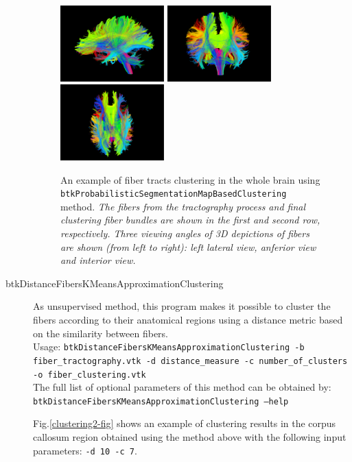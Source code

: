 \begin{description}
\begin{figure}[h]
        \includegraphics[width=4cm]{Clustering1-Left-View}
        \includegraphics[width=4cm]{Clustering1-Anterior-View}
        \includegraphics[width=4cm]{Clustering1-Interior-View}

        \caption{An example of fiber tracts clustering in the whole brain using \texttt{btkProbabilisticSegmentationMapBasedClustering} method.
        {\em The fibers from the tractography process and final clustering fiber bundles are shown in the first and second row, respectively. Three viewing angles of 3D depictions of fibers are shown (from left to right): left lateral view, anferior view and interior view. }}
        \label{clustering1-fig}
        \end{figure}

	\item[btkDistanceFibersKMeansApproximationClustering] As unsupervised method, this program makes it possible to cluster the fibers according to their anatomical regions using a distance metric based on the similarity between fibers.\\

	Usage: \texttt{btkDistanceFibersKMeansApproximationClustering -b fiber\_tractography.vtk -d distance\_measure -c number\_of\_clusters -o fiber\_clustering.vtk} \\

	The full list of optional parameters of this method can be obtained by:\\ 
        \texttt{btkDistanceFibersKMeansApproximationClustering --help}

	Fig.\ref{clustering2-fig} shows an example of clustering results in the corpus callosum region obtained using the method above with the following input parameters: \texttt{-d 10 -c 7}.


\end{description}
